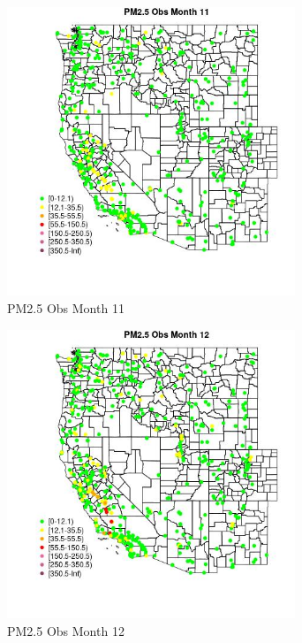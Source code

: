 \begin{figure} 
\centering  
\includegraphics[width=0.77\textwidth]{Code_Outputs/Report_ML_input_PM25_Step4_part_e_de_duplicated_aves_compiled_2019-05-14wNAs_MapObsMo11PM25_Obs.jpg} 
\caption{\label{fig:Report_ML_input_PM25_Step4_part_e_de_duplicated_aves_compiled_2019-05-14wNAsMapObsMo11PM25_Obs}PM2.5 Obs Month 11} 
\end{figure} 
 

\begin{figure} 
\centering  
\includegraphics[width=0.77\textwidth]{Code_Outputs/Report_ML_input_PM25_Step4_part_e_de_duplicated_aves_compiled_2019-05-14wNAs_MapObsMo12PM25_Obs.jpg} 
\caption{\label{fig:Report_ML_input_PM25_Step4_part_e_de_duplicated_aves_compiled_2019-05-14wNAsMapObsMo12PM25_Obs}PM2.5 Obs Month 12} 
\end{figure} 
 

